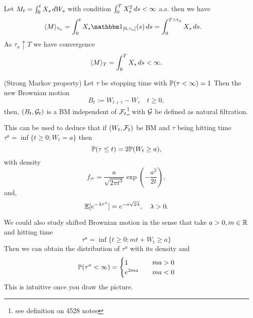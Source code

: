 \begin{example}
Let $M_t = \int_0^t X_s \mathop{}\!d W_s$ with condition $\int_0^T X_s^2 \mathop{}\!d s < \infty$ a.s. then we have
\begin{align*}
    \qvar{M}{\tau_n} &= \int_0^t X_s \I{[0,\tau_n]}(s) \diff s = \int_0^{T\land \tau_n} X_s \diff s.
 \end{align*}
 As $\tau_n \uparrow T$ we have convergence
 \begin{equation*}
     \langle{M} \rangle_{T} = \int_0^{T} X_s \mathop{}\!d s <\infty.
 \end{equation*}
\end{example}

\begin{thm}{(Strong Markov property)} Let $\tau$ be stopping time with $\mathbb{P}(\tau < \infty) =1$ Then the new Brownian motion
\begin{equation*}
    B_t := W_{t+\tau} - W_\tau \quad t\geq 0,
\end{equation*} then, $(B_t, \mathcal{G}_t)$ is a BM independent of $\mathcal{F}_t$\footnote{see definition on 4528 notes} with $\mathcal{G}$ be defined as natural filtration.
\end{thm}
This can be used to deduce that if $(W_t, \mathcal{F}_t)$ be BM and $\tau$ being hitting time $\tau^a = \inf\{t\geq0; W_t = a\}$ then
\begin{equation*}
    \mathbb{P}(\tau \leq t) = 2\mathbb{P} (W_t \geq a),
\end{equation*} 
with density
\begin{equation*}
    f_{\tau^a} = \frac{a}{\sqrt{2\pi t^3}}\exp (-\frac{a^2}{2t}),
\end{equation*} and,
\begin{equation*}
    \mathbb{E}[e^{-\lambda \tau^a}] = e^{-a\sqrt{2\lambda}}, \quad \lambda > 0.
\end{equation*}

We could also study shifted Brownian motion in the sense that take $a >0, m\in \mathbb{R}$ and hitting time
\begin{equation*}
    \tau^a = \inf\{t\geq 0; mt + W_t \geq a\}
\end{equation*}
Then we can obtain the distribution of $\tau^a$ with its density and 
\begin{equation*}
    \mathbb{P}(\tau^a < \infty) = \begin{cases}
    1 \quad &ma >0\\
    e^{2ma} \quad &ma <0
    \end{cases}
\end{equation*}
This is intuitive once you draw the picture.


